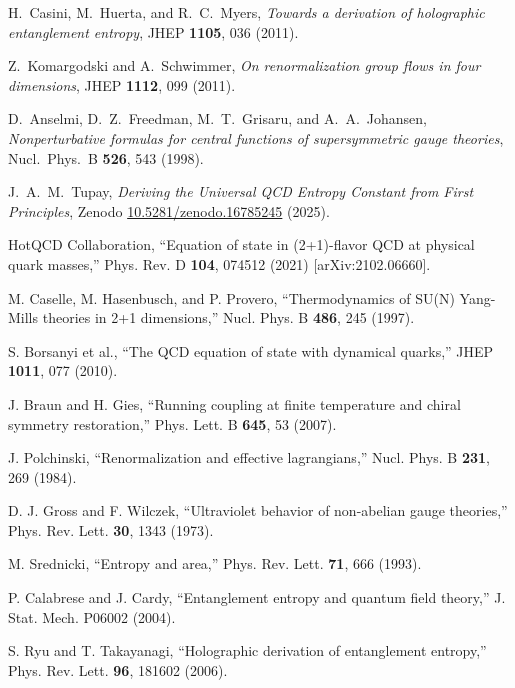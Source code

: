 \documentclass[12pt,a4paper]{article}
\begin{document}
\begin{thebibliography}{99}

H.~Casini, M.~Huerta, and R.~C.~Myers,
\emph{Towards a derivation of holographic entanglement entropy},
JHEP \textbf{1105}, 036 (2011).

Z.~Komargodski and A.~Schwimmer,
\emph{On renormalization group flows in four dimensions},
JHEP \textbf{1112}, 099 (2011).

D.~Anselmi, D.~Z.~Freedman, M.~T.~Grisaru, and A.~A.~Johansen,
\emph{Nonperturbative formulas for central functions of supersymmetric gauge theories},
Nucl.\ Phys.\ B \textbf{526}, 543 (1998).

J.~A.~M.~Tupay,
\emph{Deriving the Universal QCD Entropy Constant from First Principles},
Zenodo \href{https://doi.org/10.5281/zenodo.16785245}{10.5281/zenodo.16785245} (2025).

 HotQCD Collaboration, ``Equation of state in (2+1)-flavor QCD at physical quark masses,'' Phys. Rev. D \textbf{104}, 074512 (2021) [arXiv:2102.06660].

 M. Caselle, M. Hasenbusch, and P. Provero, ``Thermodynamics of SU(N) Yang-Mills theories in 2+1 dimensions,'' Nucl. Phys. B \textbf{486}, 245 (1997).

 S. Borsanyi et al., ``The QCD equation of state with dynamical quarks,'' JHEP \textbf{1011}, 077 (2010).

 J. Braun and H. Gies, ``Running coupling at finite temperature and chiral symmetry restoration,'' Phys. Lett. B \textbf{645}, 53 (2007).

 J. Polchinski, ``Renormalization and effective lagrangians,'' Nucl. Phys. B \textbf{231}, 269 (1984).

 D. J. Gross and F. Wilczek, ``Ultraviolet behavior of non-abelian gauge theories,'' Phys. Rev. Lett. \textbf{30}, 1343 (1973).

 M. Srednicki, ``Entropy and area,'' Phys. Rev. Lett. \textbf{71}, 666 (1993).

 P. Calabrese and J. Cardy, ``Entanglement entropy and quantum field theory,'' J. Stat. Mech. P06002 (2004).

 S. Ryu and T. Takayanagi, ``Holographic derivation of entanglement entropy,'' Phys. Rev. Lett. \textbf{96}, 181602 (2006).


\end{thebibliography}
\end{document}
